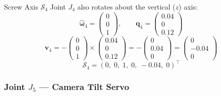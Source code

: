 \documentclass[12pt,a4paper]{article}
\newcommand{\vect}[1]{\bm{#1}}
\begin{document}
\begin{mathbox}{Screw Axis $\mathcal{S}_4$}
Joint $J_4$ also rotates about the vertical ($z$) axis:
\[
  \vect{\hat\omega}_4 = \begin{pmatrix}0\\0\\1\end{pmatrix}, \qquad
  \vect{q}_4 = \begin{pmatrix}0.04\\0\\0.12\end{pmatrix}
\]
\[
  \vect{v}_4
  = -\begin{pmatrix}0\\0\\1\end{pmatrix} \times \begin{pmatrix}0.04\\0\\0.12\end{pmatrix}
  = -\begin{pmatrix}0\\0.04\\0\end{pmatrix}
  = \begin{pmatrix}0\\-0.04\\0\end{pmatrix}
\]
\[
  \boxed{\mathcal{S}_4 = (0,\;0,\;1,\;0,\;-0.04,\;0)^\top}
\]
\end{mathbox}

\subsubsection{Joint $J_5$ --- Camera Tilt Servo}
\end{document}

